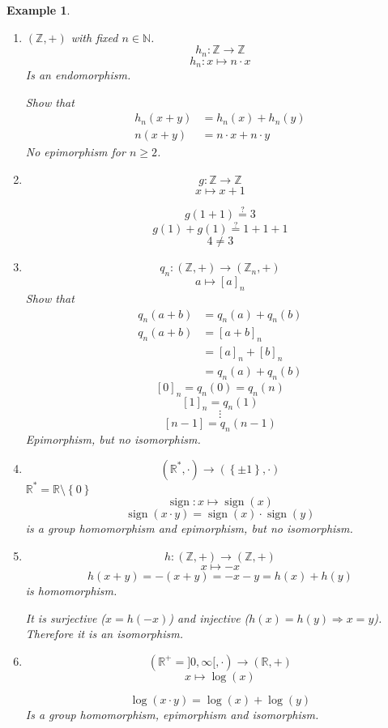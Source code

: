 \documentclass[a4paper,landscape,twocolumn]{article}
\newcommand\set[1]{\left\{#1\right\}}
\newtheorem{ex}{Example}
\begin{document}
\begin{ex}
  \begin{enumerate}
    \item $(\mathbb Z, +)$ with fixed $n \in \mathbb N$.
      \[ h_n: \mathbb Z \rightarrow \mathbb Z \]
      \[ h_n: x \mapsto n \cdot x \]
      Is an endomorphism.

      Show that
      \begin{align*}
        h_n(x + y) &= h_n(x) + h_n(y) \\
        n(x + y) &= n\cdot x + n \cdot y
      \end{align*}
      No epimorphism for $n \geq 2$.
    \item
      \[ g: \mathbb Z \rightarrow \mathbb Z \]
      \[ x \mapsto x + 1 \]

      \[ g(1 + 1) \stackrel?= 3 \]
      \[ g(1) + g(1) \stackrel?= 1 + 1 +1 \]
      \[ 4 \neq 3 \]
    \item
      \[ q_n: (\mathbb Z, +) \rightarrow (\mathbb Z_n, +) \]
      \[ a \mapsto [a]_n \]
      Show that
      \begin{align*}
        q_n(a + b) &= q_n(a) + q_n(b) \\
        q_n(a + b) &= [a + b]_n \\
                   &= [a]_n + [b]_n \\
                   &= q_n(a) + q_n(b)
      \end{align*}
      \[ [0]_n = q_n(0) = q_n(n) \]
      \[ [1]_n = q_n(1) \]
      \[ \vdots \]
      \[ [n-1] = q_n(n-1) \]
      Epimorphism, but no isomorphism.
    \item
      \[ (\mathbb R^*, \cdot) \rightarrow (\set{\pm 1}, \cdot) \]
      $\mathbb R^* = \mathbb R \setminus \set{0}$
      \[ \operatorname{sign}: x \mapsto \operatorname{sign}(x) \]
      \[ \operatorname{sign}(x\cdot y) = \operatorname{sign}(x) \cdot \operatorname{sign}(y) \]
      is a group homomorphism and epimorphism, but no isomorphism.
    \item
      \[ h: (\mathbb Z, +) \rightarrow (\mathbb Z, +) \]
      \[ x \mapsto -x \]
      \[ h(x + y) = -(x + y) = -x-y = h(x) + h(y) \]
      is homomorphism.

      It is surjective ($x = h(-x)$) and injective ($h(x) = h(y) \Rightarrow x = y$).
      Therefore it is an isomorphism.
    \item
      \[ (\mathbb R^+ = ]0, \infty[, \cdot) \rightarrow (\mathbb R, +) \]
      \[ x \mapsto \log(x) \]

      \[ \log(x \cdot y) = \log(x) + \log(y) \]
      Is a group homomorphism, epimorphism and isomorphism.
  \end{enumerate}
\end{ex}
\end{document}

